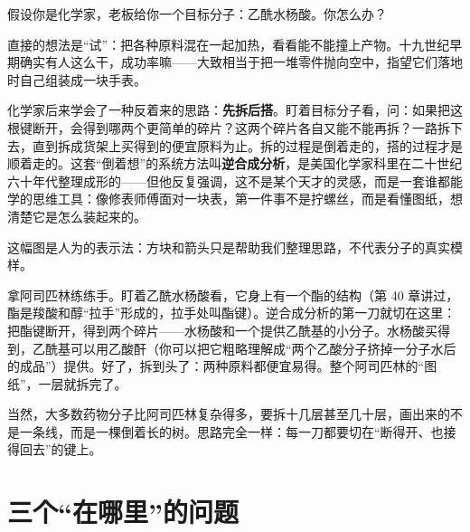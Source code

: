 假设你是化学家，老板给你一个目标分子：乙酰水杨酸。你怎么办？

直接的想法是“试”：把各种原料混在一起加热，看看能不能撞上产物。十九世纪早期确实有人这么干，成功率嘛——大致相当于把一堆零件抛向空中，指望它们落地时自己组装成一块手表。

化学家后来学会了一种反着来的思路：\textbf{先拆后搭}。盯着目标分子看，问：如果把这根键断开，会得到哪两个更简单的碎片？这两个碎片各自又能不能再拆？一路拆下去，直到拆成货架上买得到的便宜原料为止。拆的过程是倒着走的，搭的过程才是顺着走的。这套“倒着想”的系统方法叫\textbf{逆合成分析}，是美国化学家科里在二十世纪六十年代整理成形的——但他反复强调，这不是某个天才的灵感，而是一套谁都能学的思维工具：像修表师傅面对一块表，第一件事不是拧螺丝，而是看懂图纸，想清楚它是怎么装起来的。

\begin{center}
\end{center}

这幅图是人为的表示法：方块和箭头只是帮助我们整理思路，不代表分子的真实模样。

拿阿司匹林练练手。盯着乙酰水杨酸看，它身上有一个酯的结构（第 40 章讲过，酯是羧酸和醇“拉手”形成的，拉手处叫酯键）。逆合成分析的第一刀就切在这里：把酯键断开，得到两个碎片——水杨酸和一个提供乙酰基的小分子。水杨酸买得到，乙酰基可以用乙酸酐（你可以把它粗略理解成“两个乙酸分子挤掉一分子水后的成品”）提供。好了，拆到头了：两种原料都便宜易得。整个阿司匹林的“图纸”，一层就拆完了。

当然，大多数药物分子比阿司匹林复杂得多，要拆十几层甚至几十层，画出来的不是一条线，而是一棵倒着长的树。思路完全一样：每一刀都要切在“断得开、也接得回去”的键上。

\section{三个“在哪里”的问题}

